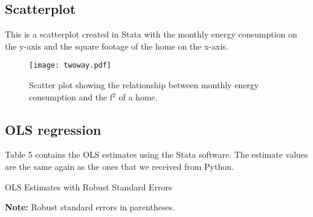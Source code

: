 \documentclass{article}
\begin{document}
\subsection{Scatterplot}

This is a scatterplot created in Stata with the monthly energy consumption on the y-axis and the square footage of the home on the x-axis.
\begin{figure}[H]\centering
    \texttt{[image: twoway.pdf]}
    \caption{Scatter plot showing the relationship between monthly energy consumption and the f$^2$ of a home.}
\end{figure}

\subsection{OLS regression}

Table 5 contains the OLS estimates using the Stata software. The estimate values are the same again as the ones that we received from Python.\
\\
\begin{table}[ht]
    \centering
    \begin{threeparttable}
    \caption{OLS Estimates with Robust Standard Errors}
        
        \begin{tablenotes}
          \small \item \textbf{Note:} Robust standard errors in parentheses. 
        \end{tablenotes}
    \end{threeparttable}
\end{table}
\end{document}
